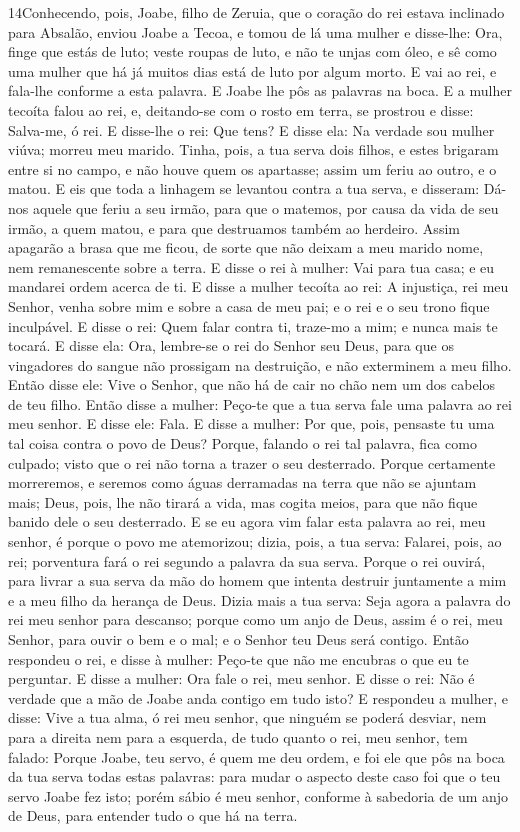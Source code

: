 \medskip

\lettrine{14} Conhecendo, pois, Joabe, filho de Zeruia, que o
coração do rei estava inclinado para Absalão, enviou Joabe a
Tecoa, e tomou de lá uma mulher e disse-lhe: Ora, finge que estás de
luto; veste roupas de luto, e não te unjas com óleo, e sê como uma
mulher que há já muitos dias está de luto por algum morto. E vai
ao rei, e fala-lhe conforme a esta palavra. E Joabe lhe pôs as
palavras na boca. E a mulher tecoíta falou ao rei, e,
deitando-se com o rosto em terra, se prostrou e disse: Salva-me, ó
rei. E disse-lhe o rei: Que tens? E disse ela: Na verdade sou
mulher viúva; morreu meu marido. Tinha, pois, a tua serva dois
filhos, e estes brigaram entre si no campo, e não houve quem os
apartasse; assim um feriu ao outro, e o matou. E eis que toda a
linhagem se levantou contra a tua serva, e disseram: Dá-nos aquele
que feriu a seu irmão, para que o matemos, por causa da vida de seu
irmão, a quem matou, e para que destruamos também ao herdeiro. Assim
apagarão a brasa que me ficou, de sorte que não deixam a meu marido
nome, nem remanescente sobre a terra. E disse o rei à mulher:
Vai para tua casa; e eu mandarei ordem acerca de ti. E disse a
mulher tecoíta ao rei: A injustiça, rei meu Senhor, venha sobre mim
e sobre a casa de meu pai; e o rei e o seu trono fique inculpável.
E disse o rei: Quem falar contra ti, traze-mo a mim; e nunca
mais te tocará. E disse ela: Ora, lembre-se o rei do Senhor
seu Deus, para que os vingadores do sangue não prossigam na
destruição, e não exterminem a meu filho. Então disse ele: Vive o
Senhor, que não há de cair no chão nem um dos cabelos de teu filho.
Então disse a mulher: Peço-te que a tua serva fale uma
palavra ao rei meu senhor. E disse ele: Fala. E disse a
mulher: Por que, pois, pensaste tu uma tal coisa contra o povo de
Deus? Porque, falando o rei tal palavra, fica como culpado; visto
que o rei não torna a trazer o seu desterrado. Porque
certamente morreremos, e seremos como águas derramadas na terra que
não se ajuntam mais; Deus, pois, lhe não tirará a vida, mas cogita
meios, para que não fique banido dele o seu desterrado. E se
eu agora vim falar esta palavra ao rei, meu senhor, é porque o povo
me atemorizou; dizia, pois, a tua serva: Falarei, pois, ao rei;
porventura fará o rei segundo a palavra da sua serva. Porque
o rei ouvirá, para livrar a sua serva da mão do homem que intenta
destruir juntamente a mim e a meu filho da herança de Deus.
Dizia mais a tua serva: Seja agora a palavra do rei meu
senhor para descanso; porque como um anjo de Deus, assim é o rei,
meu Senhor, para ouvir o bem e o mal; e o Senhor teu Deus será
contigo. Então respondeu o rei, e disse à mulher: Peço-te que
não me encubras o que eu te perguntar. E disse a mulher: Ora fale o
rei, meu senhor. E disse o rei: Não é verdade que a mão de
Joabe anda contigo em tudo isto? E respondeu a mulher, e disse: Vive
a tua alma, ó rei meu senhor, que ninguém se poderá desviar, nem
para a direita nem para a esquerda, de tudo quanto o rei, meu
senhor, tem falado: Porque Joabe, teu servo, é quem me deu ordem, e
foi ele que pôs na boca da tua serva todas estas palavras:
para mudar o aspecto deste caso foi que o teu servo Joabe fez
isto; porém sábio é meu senhor, conforme à sabedoria de um anjo de
Deus, para entender tudo o que há na terra.

